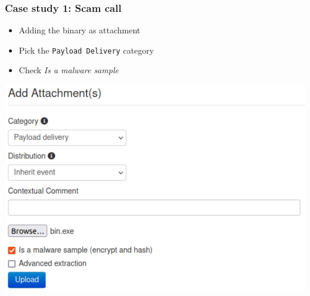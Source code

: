 \begin{frame}
    \frametitle{Case study 1: Scam call}
    \begin{itemize}
        \item Adding the binary as attachment
        \item Pick the \texttt{Payload Delivery} category
        \item Check \textit{Is a malware sample}
    \end{itemize}
    \begin{center}
        \includegraphics[width=0.80\linewidth]{pictures/case1/attribute-bin.png}
    \end{center}
\end{frame}

